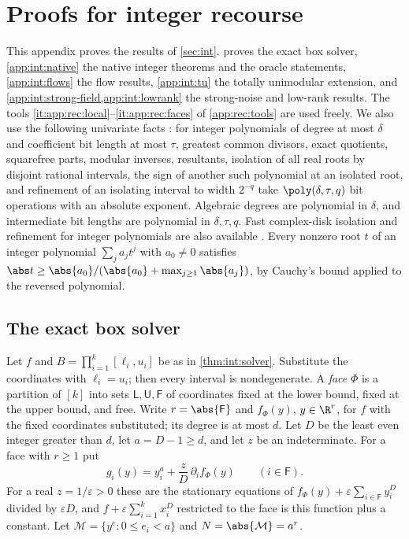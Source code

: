 \section{Proofs for integer recourse}\label{app:int}

This appendix proves the results of \cref{sec:int}. 
proves the exact box solver, \cref{app:int:native} the native integer
theorems and the oracle statements, \cref{app:int:flows} the flow results,
\cref{app:int:tu} the totally unimodular extension, and
\cref{app:int:strong-field,app:int:lowrank} the strong-noise and low-rank
results. The tools \ref{it:app:rec:local}--\ref{it:app:rec:faces} of
\cref{app:rec:tools} are used freely. We also use the following univariate
facts \citep{basu2006-algorithms-in-real-algebraic-geometry}: for integer
polynomials of degree at most $\delta$ and coefficient bit length at most
$\tau$, greatest common divisors, exact quotients, squarefree parts, modular
inverses, resultants, isolation of all real roots by disjoint rational
intervals, the sign of another such polynomial at an isolated root, and
refinement of an isolating interval to width $2^{-q}$ take
$\poly(\delta,\tau,q)$ bit operations with an absolute exponent. Algebraic
degrees are polynomial in $\delta$, and intermediate bit lengths are
polynomial in $\delta,\tau,q$. Fast complex-disk isolation and refinement for
integer polynomials are also available
\citep[arXiv v2, Theorem~5]{mehlhorn2015-from-approximate-factorization-to-root}.
Every nonzero root $t$ of an integer polynomial
$\sum_ja_jt^j$ with $a_0\ne0$ satisfies
$\abs t\ge\abs{a_0}/(\abs{a_0}+\max_{j\ge1}\abs{a_j})$, by Cauchy's bound applied
to the reversed polynomial.

\subsection{The exact box solver}\label{app:int:solver}

Let $f$ and $B=\prod_{i=1}^k[\ell_i,u_i]$ be as in \cref{thm:int:solver}.
Substitute the coordinates with $\ell_i=u_i$; then every interval is
nondegenerate. A \emph{face} $\Phi$ is a partition of $[k]$ into sets
$\mathsf L,\mathsf U,\mathsf F$ of coordinates fixed at the lower bound,
fixed at the upper bound, and free. Write $r=\abs{\mathsf F}$ and
$f_\Phi(y)$, $y\in\R^r$, for $f$ with the fixed coordinates substituted; its
degree is at most $d$. Let $D$ be the least even integer greater than $d$,
let $a=D-1\ge d$, and let $z$ be an indeterminate. For a face with $r\ge1$
put
\begin{equation}\label{eq:app:int:system}
 g_i(y)=y_i^a+\frac zD\,\partial_if_\Phi(y)\qquad(i\in\mathsf F).
\end{equation}
For a real $z=1/\varepsilon>0$ these are the stationary equations of
$f_\Phi(y)+\varepsilon\sum_{i\in\mathsf F}y_i^D$ divided by $\varepsilon D$, and
$f+\varepsilon\sum_{i=1}^kx_i^D$ restricted to the face is this function plus a
constant. Let $\mathcal M=\{y^e:0\le e_i<a\}$ and $N=\abs{\mathcal M}=a^r$.

